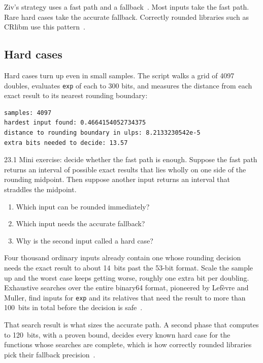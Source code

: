 \documentclass[manuscript, nonacm]{acmart}
\begin{document}
    Ziv's strategy uses a fast path and a
    fallback~\cite{ziv1991,muller,handbook}. Most inputs take the fast path.
    Rare hard cases take the accurate fallback. Correctly rounded libraries
    such as CRlibm use this pattern~\cite{crlibm}.

    \subsection{Hard cases}

    Hard cases turn up even in small samples. The script
    walks a grid of 4097 doubles, evaluates \texttt{exp} of each to 300 bits,
    and measures the distance from each exact result to its nearest rounding
    boundary:

    \begin{lstlisting}[style=output]
samples: 4097
hardest input found: 0.4664154052734375
distance to rounding boundary in ulps: 8.2133230542e-5
extra bits needed to decide: 13.57
    \end{lstlisting}


    \begin{checkpoint}{23.1}
        Mini exercise: decide whether the fast path is enough. Suppose the fast
        path returns an interval of possible exact results that lies wholly on one
        side of the rounding midpoint. Then suppose another input returns an
        interval that straddles the midpoint.
        \begin{enumerate}
            \item Which input can be rounded immediately?
            \item Which input needs the accurate fallback?
            \item Why is the second input called a hard case?
        \end{enumerate}
    \end{checkpoint}

    Four thousand ordinary inputs already contain one whose rounding decision
    needs the exact result to about 14~bits past the 53-bit format. Scale
    the sample up and the worst case keeps getting worse, roughly one extra
    bit per doubling. Exhaustive searches over the entire binary64 format,
    pioneered by Lef\`evre and Muller, find inputs for \texttt{exp} and its
    relatives that need the result to more than 100~bits in total before the
    decision is safe~\cite{lefevre}.

    That search result is what sizes the accurate path. A second phase
    that computes to 120~bits, with a proven bound, decides every known hard
    case for the functions whose searches are complete, which is how
    correctly rounded libraries pick their fallback
    precision~\cite{crlibm,muller}.
\end{document}
